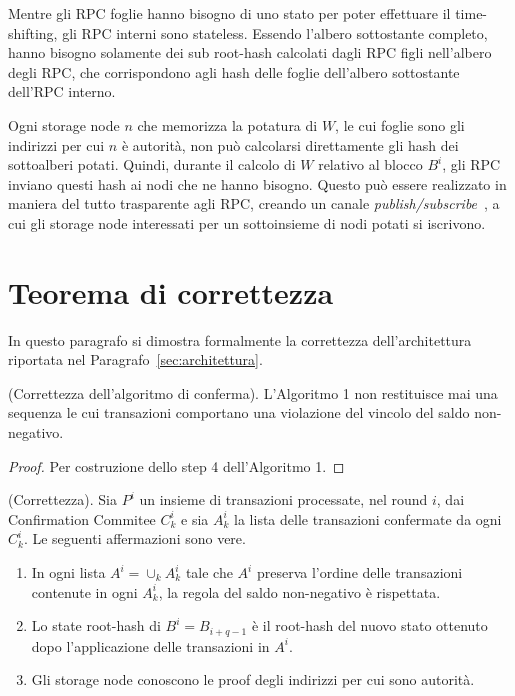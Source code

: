 Mentre gli RPC foglie hanno bisogno di uno stato per poter effettuare il time-shifting, gli RPC interni sono stateless. Essendo l'albero sottostante completo, hanno bisogno solamente dei sub root-hash calcolati dagli RPC figli nell'albero degli RPC, che corrispondono agli hash delle foglie dell'albero sottostante dell'RPC interno.

Ogni storage node $n$ che memorizza la potatura di $W$, le cui foglie sono gli indirizzi per cui $n$ è autorità, non può calcolarsi direttamente gli hash dei sottoalberi potati. Quindi, durante il calcolo di $W$ relativo al blocco $B^i$, gli RPC inviano questi hash ai nodi che ne hanno bisogno. Questo può essere realizzato in maniera del tutto trasparente agli RPC, creando un canale \textit{publish/subscribe}~\cite{eugster2003many}, a cui gli storage node interessati per un sottoinsieme di nodi potati si iscrivono.

\section{Teorema di correttezza}

In questo paragrafo si dimostra formalmente la correttezza dell'architettura riportata nel Paragrafo~\ref{sec:architettura}.

\begin{lemma}{(Correttezza dell'algoritmo di conferma).}\label{lemma:cc}
L'Algoritmo 1 non restituisce mai una sequenza le cui transazioni comportano una violazione del vincolo del saldo non-negativo.
\end{lemma}

\begin{proof}
Per costruzione dello step 4 dell'Algoritmo 1.
\end{proof}


\begin{theorem}{(Correttezza).}
Sia $P^i$ un insieme di transazioni processate, nel round $i$, dai Confirmation Commitee $C_k^i$ e sia $A_k^i$ la lista delle transazioni confermate da ogni $C_k^i$. Le seguenti affermazioni sono vere.

\begin{enumerate}
	\item In ogni lista $A^i = \cup_k A_k^i$ tale che $A^i$ preserva l'ordine delle transazioni contenute in ogni $A_k^i$, la regola del saldo non-negativo è rispettata.
	\item Lo state root-hash di $B^i = B_{i+q-1}$ è il root-hash del nuovo stato ottenuto dopo l'applicazione delle transazioni in $A^i$.
	\item Gli storage node conoscono le proof degli indirizzi per cui sono autorità.
\end{enumerate}

\end{theorem}


